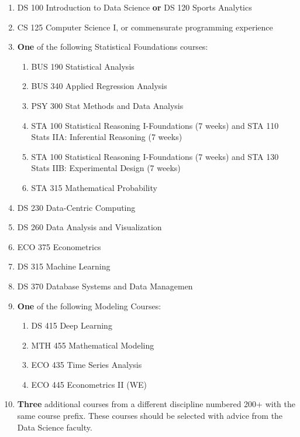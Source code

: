 \documentclass[
  letterpaper,
]{scrbook}
\providecommand{\tightlist}{%
  \setlength{\itemsep}{0pt}\setlength{\parskip}{0pt}}
\begin{document}
\begin{enumerate}
\def\labelenumi{\arabic{enumi}.}
\tightlist
\item
  DS 100 Introduction to Data Science \textbf{or} DS 120 Sports
  Analytics\\
\item
  CS 125 Computer Science I, or commensurate programming experience\\
\item
  \textbf{One} of the following Statistical Foundations courses:

  \begin{enumerate}
  \def\labelenumii{\alph{enumii}.}
  \tightlist
  \item
    BUS 190 Statistical Analysis
  \item
    BUS 340 Applied Regression Analysis
  \item
    PSY 300 Stat Methods and Data Analysis
  \item
    STA 100 Statistical Reasoning I-Foundations (7 weeks) and STA 110
    Stats IIA: Inferential Reasoning (7 weeks)
  \item
    STA 100 Statistical Reasoning I-Foundations (7 weeks) and STA 130
    Stats IIB: Experimental Design (7 weeks)
  \item
    STA 315 Mathematical Probability
  \end{enumerate}
\item
  DS 230 Data-Centric Computing
\item
  DS 260 Data Analysis and Visualization
\item
  ECO 375 Econometrics
\item
  DS 315 Machine Learning
\item
  DS 370 Database Systems and Data Managemen
\item
  \textbf{One} of the following Modeling Courses:

  \begin{enumerate}
  \def\labelenumii{\alph{enumii}.}
  \tightlist
  \item
    DS 415 Deep Learning
  \item
    MTH 455 Mathematical Modeling
  \item
    ECO 435 Time Series Analysis
  \item
    ECO 445 Econometrics II (WE)
  \end{enumerate}
\item
  \textbf{Three} additional courses from a different discipline numbered
  200+ with the same course prefix. These courses should be selected
  with advice from the Data Science faculty.
\end{enumerate}
\end{document}
